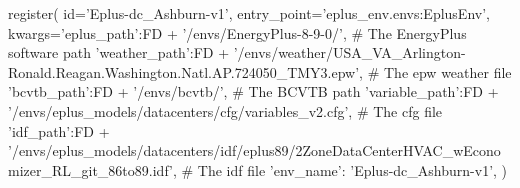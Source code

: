 register(
    id='Eplus-dc_Ashburn-v1',
    entry_point='eplus_env.envs:EplusEnv',
    kwargs={'eplus_path':FD + '/envs/EnergyPlus-8-9-0/', # The EnergyPlus software path
            'weather_path':FD + '/envs/weather/USA_VA_Arlington-Ronald.Reagan.Washington.Natl.AP.724050_TMY3.epw', # The epw weather file
            'bcvtb_path':FD + '/envs/bcvtb/', # The BCVTB path
            'variable_path':FD + '/envs/eplus_models/datacenters/cfg/variables_v2.cfg', # The cfg file
            'idf_path':FD + '/envs/eplus_models/datacenters/idf/eplus89/2ZoneDataCenterHVAC_wEconomizer_RL_git_86to89.idf', # The idf file
            'env_name': 'Eplus-dc_Ashburn-v1',
            })